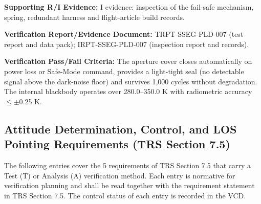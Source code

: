 \par\textbf{Supporting R/I Evidence:} I evidence: inspection of the fail-safe mechanism, spring, redundant harness and flight-article build records.
\par\textbf{Verification Report/Evidence Document:} TRPT-SSEG-PLD-007 (test report and data pack); IRPT-SSEG-PLD-007 (inspection report and records).
\par\textbf{Verification Pass/Fail Criteria:} The aperture cover closes automatically on power loss or Safe-Mode command, provides a light-tight seal (no detectable signal above the dark-noise floor) and survives 1,000 cycles without degradation. The internal blackbody operates over 280.0--350.0 K with radiometric accuracy $\le$$\pm$0.25 K.
\par\medskip
\subsection{Attitude Determination, Control, and LOS Pointing Requirements (TRS Section 7.5)}
The following entries cover the 5 requirements of TRS Section 7.5 that carry a Test (T) or Analysis (A) verification method. Each entry is normative for verification planning and shall be read together with the requirement statement in TRS Section 7.5. The control status of each entry is recorded in the VCD.
